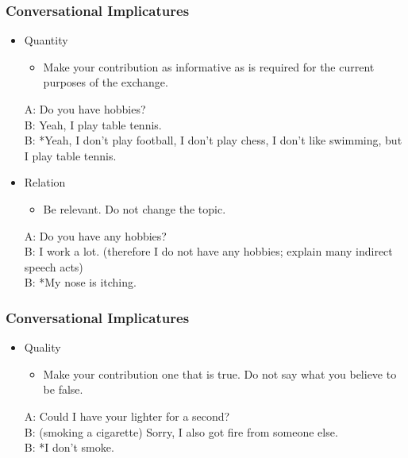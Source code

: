 \documentclass[12pt, table]{beamer}
\begin{document}
\begin{frame}
\frametitle{Conversational Implicatures}
\begin{itemize}
\item Quantity
\begin{itemize}
\item Make your contribution as informative as is required for the current purposes of the exchange.
\end{itemize}
\begin{exe}
\ex A: Do you have hobbies?\\
B: Yeah, I play table tennis.\\
B: *Yeah, I don't play football, I don't play chess, I don't like swimming, but I play table tennis.
\end{exe}
\item Relation
\begin{itemize}
\item Be relevant. Do not change the topic.
\end{itemize}
\begin{exe}
\ex A: Do you have any hobbies?\\
B: I work a lot. (therefore I do not have any hobbies; explain many indirect speech acts)\\
B: *My nose is itching.
\end{exe}
\end{itemize}
\end{frame}

\begin{frame}
\frametitle{Conversational Implicatures}
\begin{itemize}
\item Quality
\begin{itemize}
\item Make your contribution one that is true. Do not say what you believe to be false.
\end{itemize}
\begin{exe}
\ex A: Could I have your lighter for a second?\\
B: (smoking a cigarette) Sorry, I also got fire from someone else.\\
B: *I don't smoke.
\end{exe}
\end{itemize}
\end{frame}
\end{document}
